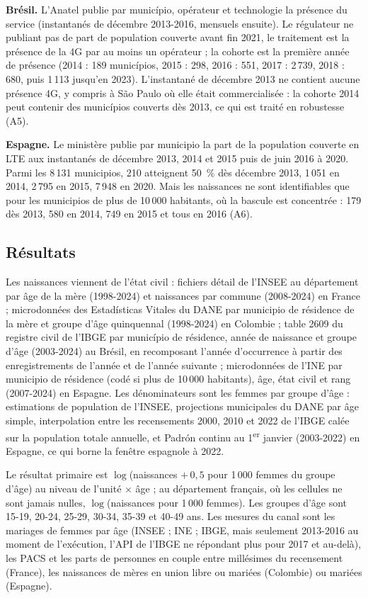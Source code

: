 \documentclass[11pt,a4paper]{article}
\begin{document}
\textbf{Brésil.} L'Anatel publie par município, opérateur et technologie la présence du service (instantanés de décembre 2013-2016, mensuels ensuite). Le régulateur ne publiant pas de part de population couverte avant fin 2021, le traitement est la présence de la 4G par au moins un opérateur ; la cohorte est la première année de présence (2014 : 189 municípios, 2015 : 298, 2016 : 551, 2017 : 2\,739, 2018 : 680, puis 1\,113 jusqu'en 2023). L'instantané de décembre 2013 ne contient aucune présence 4G, y compris à São Paulo où elle était commercialisée : la cohorte 2014 peut contenir des municípios couverts dès 2013, ce qui est traité en robustesse (A5).

\textbf{Espagne.} Le ministère publie par municipio la part de la population couverte en LTE aux instantanés de décembre 2013, 2014 et 2015 puis de juin 2016 à 2020. Parmi les 8\,131 municipios, 210 atteignent 50~\% dès décembre 2013, 1\,051 en 2014, 2\,795 en 2015, 7\,948 en 2020. Mais les naissances ne sont identifiables que pour les municipios de plus de 10\,000 habitants, où la bascule est concentrée : 179 dès 2013, 580 en 2014, 749 en 2015 et tous en 2016 (A6).

\subsection{Résultats}

Les naissances viennent de l'état civil : fichiers détail de l'INSEE au département par âge de la mère (1998-2024) et naissances par commune (2008-2024) en France ; microdonnées des Estadísticas Vitales du DANE par municipio de résidence de la mère et groupe d'âge quinquennal (1998-2024) en Colombie ; table 2609 du registre civil de l'IBGE par município de résidence, année de naissance et groupe d'âge (2003-2024) au Brésil, en recomposant l'année d'occurrence à partir des enregistrements de l'année et de l'année suivante ; microdonnées de l'INE par municipio de résidence (codé si plus de 10\,000 habitants), âge, état civil et rang (2007-2024) en Espagne. Les dénominateurs sont les femmes par groupe d'âge : estimations de population de l'INSEE, projections municipales du DANE par âge simple, interpolation entre les recensements 2000, 2010 et 2022 de l'IBGE calée sur la population totale annuelle, et Padrón continu au 1\textsuperscript{er} janvier (2003-2022) en Espagne, ce qui borne la fenêtre espagnole à 2022.

Le résultat primaire est $\log$(naissances $+\,0{,}5$ pour 1\,000 femmes du groupe d'âge) au niveau de l'unité $\times$ âge ; au département français, où les cellules ne sont jamais nulles, $\log$(naissances pour 1\,000 femmes). Les groupes d'âge sont 15-19, 20-24, 25-29, 30-34, 35-39 et 40-49 ans. Les mesures du canal sont les mariages de femmes par âge (INSEE ; INE ; IBGE, mais seulement 2013-2016 au moment de l'exécution, l'API de l'IBGE ne répondant plus pour 2017 et au-delà), les PACS et les parts de personnes en couple entre millésimes du recensement (France), les naissances de mères en union libre ou mariées (Colombie) ou mariées (Espagne).
\end{document}
